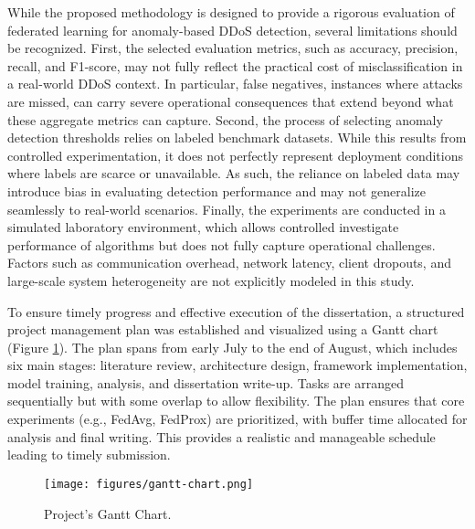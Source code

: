 While the proposed methodology is designed to provide a rigorous evaluation of federated learning for anomaly-based DDoS detection, several limitations should be recognized. First, the selected evaluation metrics, such as accuracy, precision, recall, and F1-score, may not fully reflect the practical cost of misclassification in a real-world DDoS context. In particular, false negatives, instances where attacks are missed, can carry severe operational consequences that extend beyond what these aggregate metrics can capture. Second, the process of selecting anomaly detection thresholds relies on labeled benchmark datasets. While this results from controlled experimentation, it does not perfectly represent deployment conditions where labels are scarce or unavailable. As such, the reliance on labeled data may introduce bias in evaluating detection performance and may not generalize seamlessly to real-world scenarios. Finally, the experiments are conducted in a simulated laboratory environment, which allows controlled investigate performance of algorithms but does not fully capture operational challenges. Factors such as communication overhead, network latency, client dropouts, and large-scale system heterogeneity are not explicitly modeled in this study.

To ensure timely progress and effective execution of the dissertation, a structured project management plan was established and visualized using a Gantt chart (Figure \ref{fig:gantt_chart}). The plan spans from early July to the end of August, which includes six main stages: literature review, architecture design, framework implementation, model training, analysis, and dissertation write-up. Tasks are arranged sequentially but with some overlap to allow flexibility. The plan ensures that core experiments (e.g., FedAvg, FedProx) are prioritized, with buffer time allocated for analysis and final writing. This provides a realistic and manageable schedule leading to timely submission.

\begin{figure}[h]
    \centering
    \texttt{[image: figures/gantt-chart.png]}
    \caption{Project's Gantt Chart.}
    \label{fig:gantt_chart}
\end{figure}

